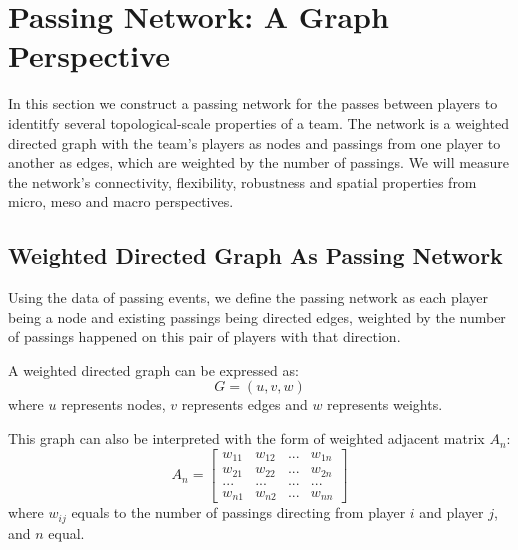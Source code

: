 \documentclass{mcmthesis}
\begin{document}
\section{Passing Network: A Graph Perspective}
In this section we construct a passing network for the passes between players to identitfy several topological-scale properties of a team. The network is a weighted directed graph with the team's players as nodes and passings from one player to another as edges, which are weighted by the number of passings. We will measure the network's connectivity, flexibility, robustness and spatial properties from micro, meso and macro perspectives.

\subsection{Weighted Directed Graph As Passing Network}
Using the data of passing events, we define the passing network as each player being a node and existing passings being directed edges, weighted by the number of passings happened on this pair of players with that direction. 

A weighted directed graph can be expressed as:
\begin{equation}
  G = (u, v, w)
\end{equation}
where $u$ represents nodes, $v$ represents edges and $w$ represents weights.

This graph can also be interpreted with the form of weighted adjacent matrix $A_n$:
\begin{equation}
  A_{n}=
  \begin{bmatrix}
      w_{11} & w_{12} & ... & w_{1n}\\ 
      w_{21} & w_{22} & ... & w_{2n}\\ 
      ... & ... & ... & ...\\ 
      w_{n1} & w_{n2} & ... & w_{nn}
  \end{bmatrix}
\end{equation}
where $w_{ij}$ equals to the number of passings directing from player $i$ and player $j$, and $n$ equal.
\end{document}
